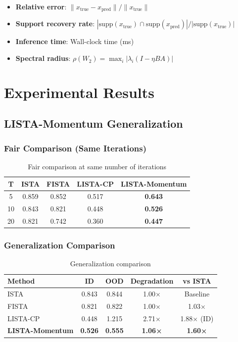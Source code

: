 \documentclass[11pt,a4paper]{article}
\begin{document}
\begin{itemize}
    \item \textbf{Relative error}: $\|x_{\text{true}} - x_{\text{pred}}\| / \|x_{\text{true}}\|$
    \item \textbf{Support recovery rate}: $|\text{supp}(x_{\text{true}}) \cap \text{supp}(x_{\text{pred}})| / |\text{supp}(x_{\text{true}})|$
    \item \textbf{Inference time}: Wall-clock time (ms)
    \item \textbf{Spectral radius}: $\rho(W_2) = \max_i |\lambda_i(I - \eta BA)|$
\end{itemize}

\section{Experimental Results}
\label{sec:results}

\subsection{LISTA-Momentum Generalization}

\subsubsection{Fair Comparison (Same Iterations)}

\begin{table}[h]
\centering
\begin{tabular}{ccccc}
\toprule
\textbf{T} & \textbf{ISTA} & \textbf{FISTA} & \textbf{LISTA-CP} & \textbf{LISTA-Momentum} \\
\midrule
5 & 0.859 & 0.852 & 0.517 & \textbf{0.643} \\
10 & 0.843 & 0.821 & 0.448 & \textbf{0.526} \\
20 & 0.821 & 0.742 & 0.360 & \textbf{0.447} \\
\bottomrule
\end{tabular}
\caption{Fair comparison at same number of iterations}
\label{tab:fair}
\end{table}

\subsubsection{Generalization Comparison}

\begin{table}[h]
\centering
\begin{tabular}{lcccc}
\toprule
\textbf{Method} & \textbf{ID} & \textbf{OOD} & \textbf{Degradation} & \textbf{vs ISTA} \\
\midrule
ISTA & 0.843 & 0.844 & 1.00× & Baseline \\
FISTA & 0.821 & 0.822 & 1.00× & 1.03× \\
LISTA-CP & 0.448 & 1.215 & 2.71× & 1.88× (ID) \\
\textbf{LISTA-Momentum} & \textbf{0.526} & \textbf{0.555} & \textbf{1.06×} & \textbf{1.60×} \\
\bottomrule
\end{tabular}
\caption{Generalization comparison}
\label{tab:gen}
\end{table}
\end{document}
